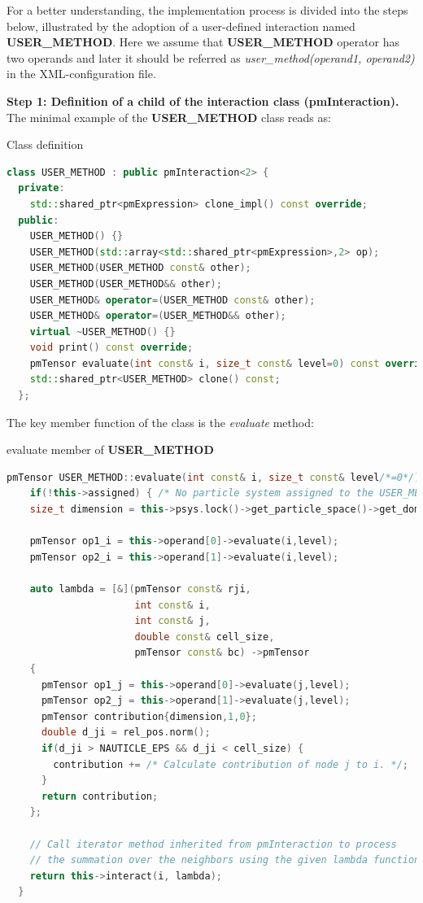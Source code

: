 \documentclass[a4paper,12pt,openany]{book}
\theoremstyle{break}
\begin{document}
For a better understanding, the implementation process is divided into the steps below, illustrated by the adoption of a user-defined interaction named \textbf{USER\_METHOD}. Here we assume that \textbf{USER\_METHOD} operator has two operands and later it should be referred as \textit{user\_method(operand1, operand2)} in the XML-configuration file.

\textbf{Step 1: Definition of a child of the interaction class (\textbf{pmInteraction}).} \\
The minimal example of the \textbf{USER\_METHOD} class reads as:
\begin{example}{Class definition}{}
\lstset{basicstyle=\tiny}
\begin{lstlisting}[language=c++]
  class USER_METHOD : public pmInteraction<2> {
  private:
    std::shared_ptr<pmExpression> clone_impl() const override;
  public:
    USER_METHOD() {}
    USER_METHOD(std::array<std::shared_ptr<pmExpression>,2> op);
    USER_METHOD(USER_METHOD const& other);
    USER_METHOD(USER_METHOD&& other);
    USER_METHOD& operator=(USER_METHOD const& other);
    USER_METHOD& operator=(USER_METHOD&& other);
    virtual ~USER_METHOD() {}
    void print() const override;
    pmTensor evaluate(int const& i, size_t const& level=0) const override;
    std::shared_ptr<USER_METHOD> clone() const;
  };
\end{lstlisting}
\end{example}
The key member function of the class is the \textit{evaluate} method:
\begin{example}{evaluate member of \textbf{USER\_METHOD}}{}
\lstset{basicstyle=\tiny}
\begin{lstlisting}[language=c++]
  pmTensor USER_METHOD::evaluate(int const& i, size_t const& level/*=0*/) const {
    if(!this->assigned) { /* No particle system assigned to the USER_METHOD interaction. */ }
    size_t dimension = this->psys.lock()->get_particle_space()->get_domain().get_dimensions();

    pmTensor op1_i = this->operand[0]->evaluate(i,level);
    pmTensor op2_i = this->operand[1]->evaluate(i,level);

    auto lambda = [&](pmTensor const& rji,
                      int const& i, 
                      int const& j, 
                      double const& cell_size, 
                      pmTensor const& bc) ->pmTensor
    {
      pmTensor op1_j = this->operand[0]->evaluate(j,level);
      pmTensor op2_j = this->operand[1]->evaluate(j,level);
      pmTensor contribution{dimension,1,0};
      double d_ji = rel_pos.norm();
      if(d_ji > NAUTICLE_EPS && d_ji < cell_size) {
        contribution += /* Calculate contribution of node j to i. */;
      }
      return contribution;
    };

    // Call iterator method inherited from pmInteraction to process 
    // the summation over the neighbors using the given lambda function.
    return this->interact(i, lambda);
  }
\end{lstlisting}
\end{example}
\end{document}
